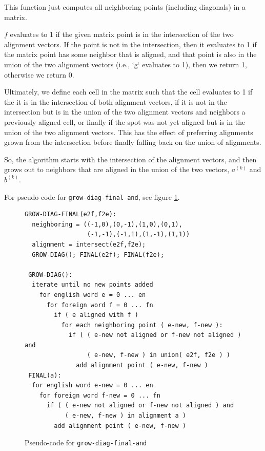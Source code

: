 \documentclass[twocolumn]{article}
\newcommand{\originalAlign}{\texttt{grow-diag-final-and}}
\begin{document}
This function just computes all neighboring points (including diagonals) in a
matrix.
\wrapSmall{\neighborsFunc{}}

$f$ evaluates to 1 if the given matrix point is in the
intersection of the two alignment vectors.
If the point is not in the intersection, then it evaluates to 1
if the matrix point has some neighbor that is aligned, and that point is also
in the union of the two alignment vectors (i.e., `g` evaluates to 1), then
we return 1, otherwise we return 0.
\wrapSmall{\isAlignedFromInterOrGrow{}}

Ultimately, we define each cell in the matrix such that
the cell evaluates to 1 if the it is in the
intersection of both alignment vectors, if it is not in the intersection but is
in the union of the two alignment vectors and neighbors a previously aligned
cell, or finally if the spot was not yet aligned but is in the union of the two
alignment vectors. This has the effect of preferring alignments grown from the
intersection before finally falling back on the union of alignments.
\wrapSmall{\growDiagMatrix{}}


So, the algorithm starts with the intersection of the alignment vectors, and
then grows out to neighbors that are aligned in the union of the two vectors,
$a^{(k)}$ and $b^{(k)}$.

For pseudo-code for \originalAlign{}, see figure \ref{fig:growDiagPseudo}.

\begin{figure}[t]
\begin{Verbatim}[frame=single]
GROW-DIAG-FINAL(e2f,f2e):
  neighboring = ((-1,0),(0,-1),(1,0),(0,1),
                 (-1,-1),(-1,1),(1,-1),(1,1))
  alignment = intersect(e2f,f2e);
  GROW-DIAG(); FINAL(e2f); FINAL(f2e);

 GROW-DIAG():
  iterate until no new points added
    for english word e = 0 ... en
      for foreign word f = 0 ... fn
        if ( e aligned with f )
          for each neighboring point ( e-new, f-new ):
            if ( ( e-new not aligned or f-new not aligned ) and
                 ( e-new, f-new ) in union( e2f, f2e ) )
              add alignment point ( e-new, f-new )
 FINAL(a):
  for english word e-new = 0 ... en
    for foreign word f-new = 0 ... fn
      if ( ( e-new not aligned or f-new not aligned ) and
           ( e-new, f-new ) in alignment a )
        add alignment point ( e-new, f-new )
\end{Verbatim}
\caption{Pseudo-code for \originalAlign{}}
\label{fig:growDiagPseudo}
\end{figure}
\end{document}
